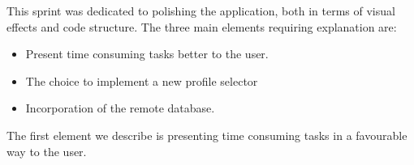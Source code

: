 This sprint was dedicated to polishing the application, both in terms of visual effects and code structure.
The three main elements requiring explanation are:

\begin{itemize}
\item Present time consuming tasks better to the user.
\item The choice to implement a new profile selector
\item Incorporation of the remote database.
\end{itemize}

The first element we describe is presenting time consuming tasks in a favourable way to the user.